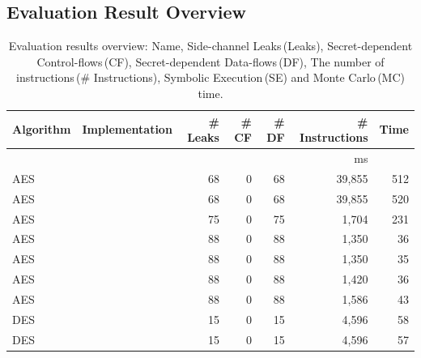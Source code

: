 \subsection{Evaluation Result Overview}
\begin{table}[]
  \centering\small\footnotesize
  \caption{Evaluation results overview: Name, Side-channel Leaks\,(Leaks), 
      Secret-dependent Control-flows\,(CF), Secret-dependent Data-flows\,(DF),
      The number of instructions\,(\# Instructions), Symbolic Execution\,(SE) and Monte Carlo\,(MC) time.
  }\label{table:over_result}
  \newlength{\x}
  \newlength{\y}
  \settowidth{\x}{~~}
  \settowidth{\y}{m}
  \addtolength{\x}{-1\y}
  \newcommand{\foo}{\mbox{\hspace*{\the\x}}}
  \begin{tabular}{lrrrrrr}
      \hline
      \textbf{Algorithm} & \textbf{Implementation}  & \textbf{\# Leaks} & \textbf{\# CF}         & \textbf{\# DF}
                         & \textbf{\# Instructions}    & \textbf{Time}     \\\hline
                                               &                        &                     &                      &              & ms                     \\\cline{6-6}
      AES &             & 68                     & 0                   & 68                   & 39,855        & 512     \\
      AES &                & 68                     & 0                   & 68                   & 39,855       & 520         \\
      AES &                & 75                     & 0                   & 75                   & 1,704        & 231       \\
      AES &                & 88                     & 0                   & 88                   & 1,350        & 36     \\
      AES&           & 88                     & 0                   & 88                   & 1,350        & 35   \\
      AES &         & 88                     & 0                   & 88                   & 1,420        & 36    \\
      AES &        & 88                     & 0                   & 88                   & 1,586        & 43      \\
      DES &         & 15                     & 0                   & 15                   & 4,596        & 58     \\
      DES &             & 15                     & 0                   & 15                   & 4,596        & 57      \\

\end{tabular}
\end{table}
